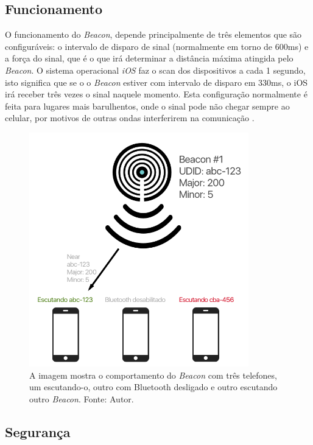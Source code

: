 \documentclass[
	12pt,
	oneside,
	a4paper,
	english,
	brazil,
]{abntex2}
\begin{document}
\subsection{Funcionamento}

O funcionamento do \emph{Beacon}, depende principalmente de três elementos que são configuráveis: o intervalo de disparo de sinal (normalmente em torno de 600ms) e a força do sinal, que é o que irá determinar a distância máxima atingida pelo \emph{Beacon}. O sistema operacional \emph{iOS} faz o scan dos dispositivos a cada 1 segundo, isto significa que se o o \emph{Beacon} estiver com intervalo de disparo em 330ms, o iOS irá receber três vezes o sinal naquele momento. Esta configuração normalmente é feita para lugares mais barulhentos, onde o sinal pode não chegar sempre ao celular, por motivos de outras ondas interferirem na comunicação \cite{beacon-how-it-works-estimote}.

\begin{figure}[h]
\centering
\includegraphics[width=0.85\textwidth]{beacon-how-it-works}
    \caption{
        A imagem mostra o comportamento do \emph{Beacon} com três telefones, um escutando-o, outro com Bluetooth desligado e outro escutando outro \emph{Beacon}. Fonte: Autor.
    }
\end{figure}

\subsection{Segurança}
\end{document}
